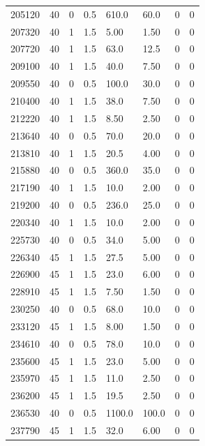 \documentclass[preview]{standalone}
\begin{document}
{{{{{{{{\begin{tabular}{L{1.2cm}C{1.2cm} C{0.3cm}C{0.5cm} C{1.4cm}C{1.4cm} C{1.4cm}C{1.4cm}}
  205120  &    40  & 0     & 0.5 &  610.0  & 60.0  & 0 &  0   \\ 
  207320  &    40  & 1     & 1.5 &  5.00  & 1.50  & 0 &  0   \\ 
  207720  &    40  & 1     & 1.5 &  63.0  & 12.5  & 0 &  0   \\ 
  209100  &    40  & 1     & 1.5 &  40.0  & 7.50  & 0 &  0   \\ 
  209550  &    40  & 0     & 0.5 &  100.0  & 30.0  & 0 &  0   \\ 
  210400  &    40  & 1     & 1.5 &  38.0  & 7.50  & 0 &  0   \\ 
  212220  &    40  & 1     & 1.5 &  8.50  & 2.50  & 0 &  0   \\ 
  213640  &    40  & 0     & 0.5 &  70.0  & 20.0  & 0 &  0   \\ 
  213810  &    40  & 1     & 1.5 &  20.5  & 4.00  & 0 &  0   \\ 
  215880  &    40  & 0     & 0.5 &  360.0  & 35.0  & 0 &  0   \\ 
  217190  &    40  & 1     & 1.5 &  10.0  & 2.00  & 0 &  0   \\ 
  219200  &    40  & 0     & 0.5 &  236.0  & 25.0  & 0 &  0   \\ 
  220340  &    40  & 1     & 1.5 &  10.0  & 2.00  & 0 &  0   \\ 
  225730  &    40  & 0     & 0.5 &  34.0  & 5.00  & 0 &  0   \\ 
  226340  &    45  & 1     & 1.5 &  27.5  & 5.00  & 0 &  0   \\ 
  226900  &    45  & 1     & 1.5 &  23.0  & 6.00  & 0 &  0   \\ 
  228910  &    45  & 1     & 1.5 &  7.50  & 1.50  & 0 &  0   \\ 
  230250  &    40  & 0     & 0.5 &  68.0  & 10.0  & 0 &  0   \\ 
  233120  &    45  & 1     & 1.5 &  8.00  & 1.50  & 0 &  0   \\ 
  234610  &    40  & 0     & 0.5 &  78.0  & 10.0  & 0 &  0   \\ 
  235600  &    45  & 1     & 1.5 &  23.0  & 5.00  & 0 &  0   \\ 
  235970  &    45  & 1     & 1.5 &  11.0  & 2.50  & 0 &  0   \\ 
  236200  &    45  & 1     & 1.5 &  19.5  & 2.50  & 0 &  0   \\ 
  236530  &    40  & 0     & 0.5 &  1100.0  & 100.0  & 0 &  0   \\ 
  237790  &    45  & 1     & 1.5 &  32.0  & 6.00  & 0 &  0   \\ 
\hline 
\end{tabular} 

}}}}}}}}
\end{document}
